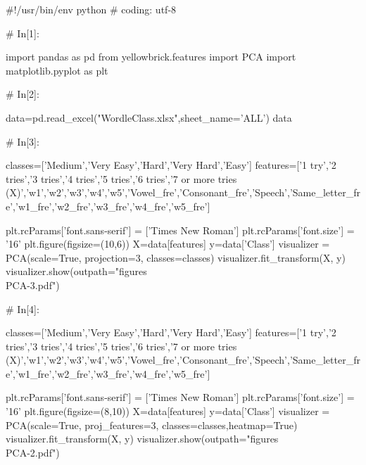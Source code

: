 \documentclass{MathModeling}
\begin{document}
\begin{python}
#!/usr/bin/env python
# coding: utf-8

# In[1]:


import pandas as pd
from yellowbrick.features import PCA
import matplotlib.pyplot as plt


# In[2]:


data=pd.read_excel("WordleClass.xlsx",sheet_name='ALL')
data


# In[3]:


classes=['Medium','Very Easy','Hard','Very Hard','Easy']
features=['1 try','2 tries','3 tries','4 tries','5 tries','6 tries','7 or more tries (X)','w1','w2','w3','w4','w5','Vowel_fre','Consonant_fre','Speech','Same_letter_fre','w1_fre','w2_fre','w3_fre','w4_fre','w5_fre']

plt.rcParams['font.sans-serif'] = ['Times New Roman']
plt.rcParams['font.size'] = '16'
plt.figure(figsize=(10,6))
X=data[features]
y=data['Class']
visualizer = PCA(scale=True, projection=3, classes=classes)
visualizer.fit_transform(X, y)
visualizer.show(outpath="figures\\PCA-3.pdf")


# In[4]:


classes=['Medium','Very Easy','Hard','Very Hard','Easy']
features=['1 try','2 tries','3 tries','4 tries','5 tries','6 tries','7 or more tries (X)','w1','w2','w3','w4','w5','Vowel_fre','Consonant_fre','Speech','Same_letter_fre','w1_fre','w2_fre','w3_fre','w4_fre','w5_fre']

plt.rcParams['font.sans-serif'] = ['Times New Roman']
plt.rcParams['font.size'] = '16'
plt.figure(figsize=(8,10))
X=data[features]
y=data['Class']
visualizer = PCA(scale=True, proj_features=3, classes=classes,heatmap=True)
visualizer.fit_transform(X, y)
visualizer.show(outpath="figures\\PCA-2.pdf")


\end{python}
\end{document}
